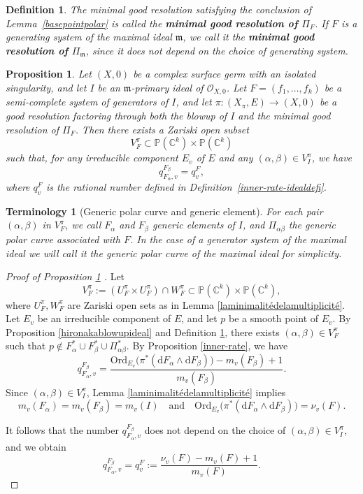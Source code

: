 \documentclass[reqno,dvipsnames,12pt]{amsart}
\newtheorem{prop}[thm]{Proposition}
\newtheorem{defi}[thm]{Definition}
\newtheorem{term}[thm]{Terminology}
\begin{document}
\begin{defi}\label{principalizationalacon}
The minimal good resolution satisfying the conclusion of Lemma~\ref{basepointpolar} is called the
\textbf{minimal good resolution of $\Pi_{F}$}. If $F$ is a generating system of the maximal ideal $\mathfrak{m}$, we call it the
\textbf{minimal good resolution of $\Pi_{\mathfrak{m}}$}, since it does not depend on the choice of generating system.
\end{defi}

\begin{prop}\label{inner-rate-ideal}
Let $(X,0)$ be a complex surface germ with an isolated singularity, and let $I$ be an $\mathfrak{m}$-primary ideal of $\mathcal{O}_{X,0}$. Let $F=(f_1,\dots,f_k)$ be a semi-complete system of generators of $I$, and let $\pi:(X_{\pi},E)\longrightarrow (X,0)$
be a good resolution factoring through both the blowup of $I$ and the minimal good resolution of  $\Pi_F$.
Then there exists a Zariski open subset
\[
V_{F}^{\pi}\subset \mathbb{P}(\mathbb{C}^k)\times \mathbb{P}(\mathbb{C}^k)
\]
such that, for any irreducible component $E_v$ of $E$ and any $(\alpha,\beta)\in V_{I}^{\pi}$, we have
\[
q_{F_{\alpha},v}^{F_{\beta}}=q_v^{F},
\]
where $q_v^{F}$ is the rational number defined in Definition~\ref{inner-rate-idealdefi}.
\end{prop}
\begin{term}[Generic polar curve and generic element]\label{genericpolarcurveofthemaximalideal}
For each pair $(\alpha,\beta)$ in $V_F^{\pi}$, we call $F_{\alpha}$ and $F_{\beta}$ generic elements of $I$, and $\Pi_{\alpha\beta}$ the generic polar curve associated with $F$. In the case of a generator system of the maximal ideal we will call it the generic polar curve of the maximal ideal for simplicity.
\end{term}
\begin{proof}[Proof of Proposition \ref{inner-rate-ideal} ]
Let
\[
V_F^{\pi}:=(U_F^{\pi}\times U_F^{\pi}) \cap W_{F}^{\pi}
\subset \mathbb{P}(\mathbb{C}^k)\times \mathbb{P}(\mathbb{C}^k),
\]
where \(U_F^{\pi},W_{F}^{\pi}\) are Zariski open sets as in Lemma \ref{laminimalitédelamultiplicité}. Let \(E_v\) be an irreducible component of \(E\), and let \(p\) be a smooth point of \(E_v\). By Proposition \ref{hironakablowupideal} and Definition \ref{principalizationalacon}, there exists \((\alpha,\beta)\in V_{F}^{\pi}\) such that $p \notin F_{\alpha}^* \cup F_{\beta}^* \cup \Pi_{{\alpha \beta}}^*.$ By Proposition \ref{inner-rate}, we have
\[
q_{F_{\alpha},v}^{F_{\beta}}
=
\frac{\mathrm{Ord}_{E_v}\big(\pi^{*} (\mathrm{d} F_{\alpha} \wedge \mathrm{d}F_{\beta})\big)
- m_v(F_{\beta}) + 1}{m_v(F_{\beta})}.\]Since \((\alpha,\beta)\in V_{I}^{\pi}\), Lemma \ref{laminimalitédelamultiplicité} implies
\[
m_v(F_{\alpha}) = m_v(F_{\beta}) = m_v(I)
\quad \text{and} \quad
\mathrm{Ord}_{E_v}\big(\pi^{*} (\mathrm{d} F_{\alpha} \wedge \mathrm{d}F_{\beta})\big)
= \nu_v(F).
\]

It follows that the number \(q_{F_{\alpha},v}^{F_{\beta}}\) does not depend on the choice of \((\alpha,\beta)\in V_{I}^{\pi}\), and we obtain
\[
q_{F_{\alpha},v}^{F_{\beta}}
=
q_v^{F}
:=
\frac{\nu_v(F)-m_v(F)+1}{m_v(F)}.
\]
\end{proof}
\end{document}
